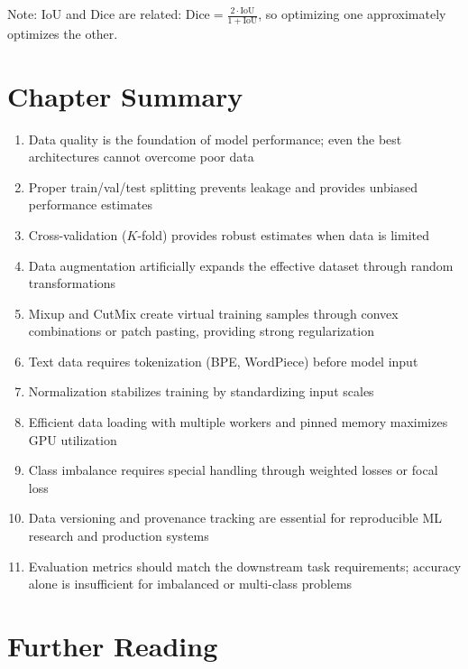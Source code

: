 Note: IoU and Dice are related: $\text{Dice} = \frac{2 \cdot \text{IoU}}{1 + \text{IoU}}$, so optimizing one approximately optimizes the other.

\section{Chapter Summary}

\begin{enumerate}
    \item Data quality is the foundation of model performance; even the best architectures cannot overcome poor data
    \item Proper train/val/test splitting prevents leakage and provides unbiased performance estimates
    \item Cross-validation ($K$-fold) provides robust estimates when data is limited
    \item Data augmentation artificially expands the effective dataset through random transformations
    \item Mixup and CutMix create virtual training samples through convex combinations or patch pasting, providing strong regularization
    \item Text data requires tokenization (BPE, WordPiece) before model input
    \item Normalization stabilizes training by standardizing input scales
    \item Efficient data loading with multiple workers and pinned memory maximizes GPU utilization
    \item Class imbalance requires special handling through weighted losses or focal loss
    \item Data versioning and provenance tracking are essential for reproducible ML research and production systems
    \item Evaluation metrics should match the downstream task requirements; accuracy alone is insufficient for imbalanced or multi-class problems
\end{enumerate}

\section{Further Reading}

